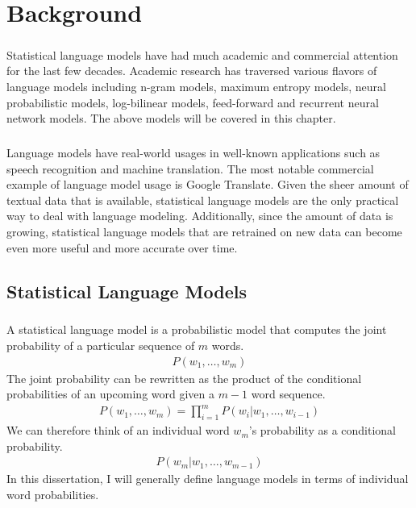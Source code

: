 
\chapter{Background}
\paragraph{}
Statistical language models have had much academic and commercial attention for the last few decades. Academic research has traversed various flavors of language models including n-gram models, maximum entropy models, neural probabilistic models, log-bilinear models, feed-forward and recurrent neural network models. The above models will be covered in this chapter. 
\paragraph{}
Language models have real-world usages in well-known applications such as speech recognition and machine translation. The most notable commercial example of language model usage is Google Translate. Given the sheer amount of textual data that is available, statistical language models are the only practical way to deal with language modeling. Additionally, since the amount of data is growing,  statistical language models that are retrained on new data can become even more useful and more accurate over time.

\section{Statistical Language Models}
\paragraph{}
A statistical language model is a probabilistic model that computes the joint probability of a particular sequence of  $m$ words.  
\begin{align}
P(w_1, \dots ,w_m)
\end{align}
The joint probability can be rewritten as the product of the conditional probabilities of an upcoming word given a $m-1$ word sequence.
\begin{align}
P(w_1, \dots ,w_m) = \prod_{i=1}^m P(w_i | w_1,\dots, w_{i-1})
\end{align}
We can therefore think of an individual word $w_m$'s probability as a conditional probability.
\begin{align}
P(w_m | w_1,\dots, w_{m-1})
\end{align}
In this dissertation, I will generally define language models in terms of individual word probabilities.
